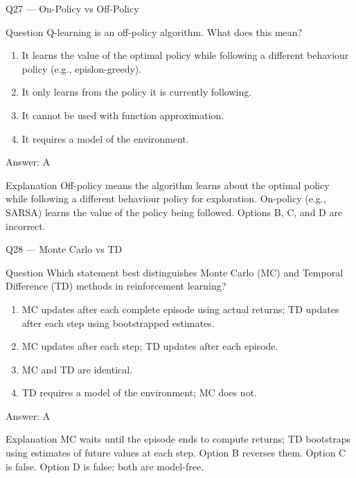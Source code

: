 \documentclass[aspectratio=169,8pt]{beamer}
\begin{document}
	\begin{frame}{Q27 --- On-Policy vs Off-Policy}
		\begin{block}{Question}
			Q-learning is an off-policy algorithm. What does this mean?
			\begin{enumerate}
				\item It learns the value of the optimal policy while following a different behaviour policy (e.g., epislon-greedy).
				\item It only learns from the policy it is currently following.
				\item It cannot be used with function approximation.
				\item It requires a model of the environment.
			\end{enumerate}
		\end{block}
		\begin{exampleblock}{Answer: A}\end{exampleblock}
		\begin{block}{Explanation}
			Off-policy means the algorithm learns about the optimal policy while following a different behaviour policy for exploration. On-policy (e.g., SARSA) learns the value of the policy being followed. Options B, C, and D are incorrect.
		\end{block}
	\end{frame}
	
	\begin{frame}{Q28 --- Monte Carlo vs TD}
		\begin{block}{Question}
			Which statement best distinguishes Monte Carlo (MC) and Temporal Difference (TD) methods in reinforcement learning?
			\begin{enumerate}
				\item MC updates after each complete episode using actual returns; TD updates after each step using bootstrapped estimates.
				\item MC updates after each step; TD updates after each episode.
				\item MC and TD are identical.
				\item TD requires a model of the environment; MC does not.
			\end{enumerate}
		\end{block}
		\begin{exampleblock}{Answer: A}\end{exampleblock}
		\begin{block}{Explanation}
			MC waits until the episode ends to compute returns; TD bootstraps using estimates of future values at each step. Option B reverses them. Option C is false. Option D is false; both are model-free.
		\end{block}
	\end{frame}
	
\end{document}
